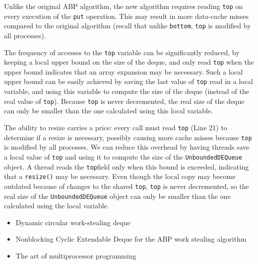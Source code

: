
Unlike the original ABP algorithm, the new algorithm requires reading
\lstinline!top! on every execution of the \lstinline!put!
operation. This may result in more data-cache misses compared to the
original algorithm (recall that unlike \lstinline!bottom!,
\lstinline!top! is modified by all processes).

The frequency of accesses to the \lstinline!top! variable can be
significantly reduced, by keeping a local upper bound on the size of
the deque, and only read \lstinline!top! when the upper bound
indicates that an array expansion may be necessary. Such a local upper
bound can be easily achieved by saving the last value of
\lstinline!top! read in a local variable, and using this variable to
compute the size of the deque (instead of the real value of
\lstinline!top!). Because \lstinline!top! is never decremented, the
real size of the deque can only be smaller than the one calculated
using this local variable.


The ability to resize carries a price: every call must read
\lstinline!top! (Line 21) to determine if a resize is necessary,
possibly causing more cache misses because \lstinline!top!  is
modified by all processes. We can reduce this overhead by having
threads save a local value of \lstinline!top!  and using it to compute
the size of the \lstinline!UnboundedDEQueue!  object. A thread reads
the \lstinline!top!field only when this bound is exceeded, indicating
that a \lstinline!resize()! may be necessary.  Even though the local
copy may become outdated because of changes to the shared
\lstinline!top!, \lstinline!top! is never decremented, so the real
size of the \lstinline!UnboundedDEQueue! object can only be smaller
than the one calculated using the local variable.


\begin{itemize}
\item Dynamic circular work-stealing deque \cite{Chase2005}
\item Nonblocking Cyclic Extendable Deque for the ABP work stealing
  algorithm \cite{Lev2005}
\item The art of multiprocessor programming \cite{Herlihy2008}
\end{itemize}

\newpage
{}


